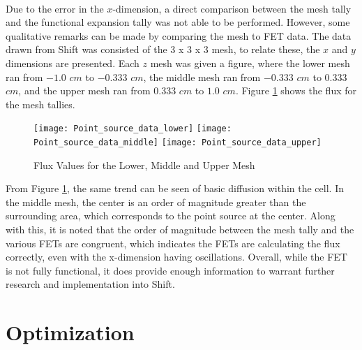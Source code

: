 \documentclass[10tma4paper]{article}
\begin{document}
\\
Due to the error in the $x$-dimension, a direct comparison between the mesh tally and the functional expansion tally was not able to be performed. However, some qualitative remarks can be made by comparing the mesh to FET data. The data drawn from Shift was consisted of the 3 x 3 x 3 mesh, to relate these, the $x$ and $y$ dimensions are presented. Each $z$ mesh was given a figure, where the lower mesh ran from $-1.0$ $cm$ to $-0.333$ $cm$, the middle mesh ran from $-0.333$ $cm$ to $0.333$ $cm$, and the upper mesh ran from $0.333$ $cm$ to $1.0$ $cm$. Figure \ref{MeshHistogram} shows the flux for the mesh tallies.
\begin{figure}[H]
	\caption{Flux Values for the Lower, Middle and Upper Mesh}
	\begin{center}
		\texttt{[image: Point\_source\_data\_lower]}
		\texttt{[image: Point\_source\_data\_middle]}
		\texttt{[image: Point\_source\_data\_upper]}
	\end{center}
	\label{MeshHistogram}
\end{figure}
\noindent From Figure \ref{MeshHistogram}, the same trend can be seen of basic diffusion within the cell. In the middle mesh, the center is an order of magnitude greater than the surrounding area, which corresponds to the point source at the center. Along with this, it is noted that the order of magnitude between the mesh tally and the various FETs are congruent, which indicates the FETs are calculating the flux correctly, even with the x-dimension having oscillations. Overall, while the FET is not fully functional, it does provide enough information to warrant further research and implementation into Shift.

\section{Optimization}\label{optimization}
\end{document}
